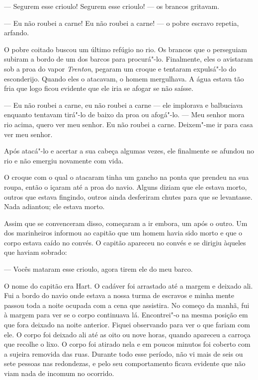 --- Segurem esse crioulo! Segurem esse crioulo! --- os brancos gritavam.

--- Eu não roubei a carne! Eu não roubei a carne! --- o pobre escravo
repetia, arfando.

O pobre coitado buscou um último refúgio no rio. Os brancos que o
perseguiam subiram a bordo de um dos barcos para procurá"-lo. Finalmente,
eles o avistaram sob a proa do vapor \emph{Trenton}, pegaram um croque e
tentaram expulsá"-lo do esconderijo. Quando eles o atacavam, o homem
mergulhava. A água estava tão fria que logo ficou evidente que ele iria
se afogar se não saísse.

--- Eu não roubei a carne, eu não roubei a carne --- ele implorava e
balbuciava enquanto tentavam tirá"-lo de baixo da proa ou afogá"-lo. ---
Meu senhor mora rio acima, quero ver meu senhor. Eu não roubei a carne.
Deixem"-me ir para casa ver meu senhor.

Após atacá"-lo e acertar a sua cabeça algumas vezes, ele finalmente se
afundou no rio e não emergiu novamente com vida.

O croque com o qual o atacaram tinha um gancho na ponta que prendeu na
sua roupa, então o içaram até a proa do navio. Alguns diziam que ele
estava morto, outros que estava fingindo, outros ainda desferiram chutes
para que se levantasse. Nada adiantou; ele estava morto.

Assim que se convenceram disso, começaram a ir embora, um após o outro.
Um dos marinheiros informou ao capitão que um homem havia sido morto e
que o corpo estava caído no convés. O capitão apareceu no convés e se
dirigiu àqueles que haviam sobrado:

--- Vocês mataram esse crioulo, agora tirem ele do meu barco.

O nome do capitão era Hart. O cadáver foi arrastado até a margem e
deixado ali. Fui a bordo do navio onde estava a nossa turma de escravos
e minha mente passou toda a noite ocupada com a cena que assistira. No
começo da manhã, fui à margem para ver se o corpo continuava lá.
Encontrei"-o na mesma posição em que fora deixado na noite anterior.
Fiquei observando para ver o que fariam com ele. O corpo foi deixado ali
até as oito ou nove horas, quando apareceu a carroça que recolhe o lixo.
O corpo foi atirado nela e em poucos minutos foi coberto com a sujeira
removida das ruas. Durante todo esse período, não vi mais de seis ou
sete pessoas nas redondezas, e pelo seu comportamento ficava evidente
que não viam nada de incomum no ocorrido.

